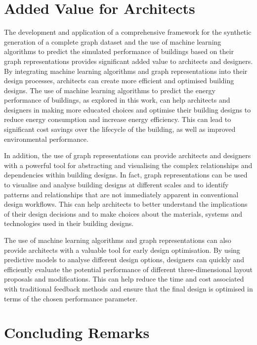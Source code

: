 \documentclass[a4paper, 12pt]{report}
\begin{document}
\section{Added Value for Architects}\label{sec:added-value-for-architects}

The development and application of a comprehensive framework for the synthetic generation of a complete graph dataset and the use of machine learning algorithms to predict the simulated performance of buildings based on their graph representations provides significant added value to architects and designers. By integrating machine learning algorithms and graph representations into their design processes, architects can create more efficient and optimised building designs. The use of machine learning algorithms to predict the energy performance of buildings, as explored in this work, can help architects and designers in making more educated choices and optimise their building designs to reduce energy consumption and increase energy efficiency. This can lead to significant cost savings over the lifecycle of the building, as well as improved environmental performance.

In addition, the use of graph representations can provide architects and designers with a powerful tool for abstracting and visualising the complex relationships and dependencies within building designs. In fact, graph representations can be used to visualise and analyse building designs at different scales and to identify patterns and relationships that are not immediately apparent in conventional design workflows. This can help architects to better understand the implications of their design decisions and to make choices about the materials, systems and technologies used in their building designs.

The use of machine learning algorithms and graph representations can also provide architects with a valuable tool for early design optimisation. By using predictive models to analyse different design options, designers can quickly and efficiently evaluate the potential performance of different three-dimensional layout proposals and modifications. This can help reduce the time and cost associated with traditional feedback methods and ensure that the final design is optimised in terms of the chosen performance parameter.

\section{Concluding Remarks}\label{sec:concluding-remarks}
\end{document}

